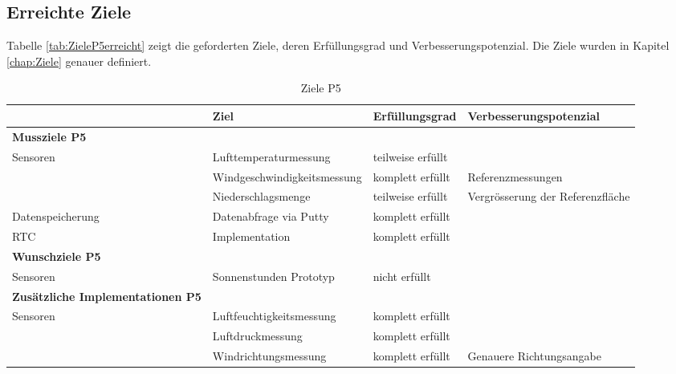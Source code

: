 \begin{landscape}
\subsection{Erreichte Ziele}
\label{erreichteZiele}

Tabelle \ref{tab:ZieleP5erreicht} zeigt die geforderten Ziele, deren Erfüllungsgrad und Verbesserungspotenzial. Die Ziele wurden in Kapitel \ref{chap:Ziele} genauer definiert.\\

\begin{table}[htbp]
  \centering
  \caption{Ziele P5}
    \begin{tabular}{l|l|l|l}
          & \textbf{Ziel} & \multicolumn{1}{l|}{\textbf{Erfüllungsgrad}} & \textbf{Verbesserungspotenzial}  \\
    \toprule
    \multicolumn{1}{l}{\textbf{Mussziele P5}} & \multicolumn{1}{r}{} & \multicolumn{1}{r}{} & \multicolumn{1}{r}{}  \\
    \toprule
    \multicolumn{1}{l|}{Sensoren}&Lufttemperaturmessung& teilweise erfüllt &  \\
\cline{2-4}          &Windgeschwindigkeitsmessung& komplett erfüllt &Referenzmessungen \\
\cline{2-4} &Niederschlagsmenge&teilweise erfüllt& Vergrösserung der Referenzfläche \\
    \hline
    \multicolumn{1}{l|}{Datenspeicherung}&Datenabfrage via Putty&komplett erfüllt& \\
    \hline
    \multicolumn{1}{l|}{RTC} &Implementation&komplett erfüllt& \\
\bottomrule
\multicolumn{1}{l}{\textbf{Wunschziele P5}} & \multicolumn{1}{l}{} & \multicolumn{1}{l}{} & \multicolumn{1}{l}{}  \\
    \toprule
    \multicolumn{1}{l|}{Sensoren}&Sonnenstunden Prototyp&nicht erfüllt &  \\
    \bottomrule
    \multicolumn{1}{l}{\textbf{Zusätzliche Implementationen P5}} & \multicolumn{1}{r}{} & \multicolumn{1}{r}{} & \multicolumn{1}{r}{}  \\
    \toprule
    \multicolumn{1}{l|}{Sensoren}&Luftfeuchtigkeitsmessung& komplett erfüllt &  \\
\cline{2-4}          &Luftdruckmessung& komplett erfüllt & \\
\cline{2-4} &Windrichtungsmessung&komplett erfüllt& Genauere Richtungsangabe \\
    

\end{tabular}
\end{table}
\end{landscape}
